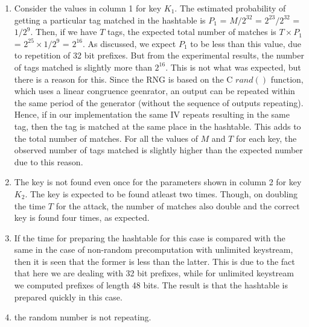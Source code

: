 \begin{enumerate}
\item Consider the values in column 1 for key $K_1$. The estimated probability of getting a particular tag matched in the hashtable is $P_1$ = $M/2^{32}$ = $2^{23}/2^{32}$ = $1/2^{9}$. Then, if we have $T$ tags, the expected total number of matches is $T \times P_1$ = $2^{25} \times 1/2^{9}$ = $2^{16}$. As discussed, we expect $P_1$ to be less than this value, due to repetition of 32 bit prefixes. But from the experimental results, the number of tags matched is slightly more than $2^{16}$. This is not what was expected, but there is a reason for this.
Since the RNG is based on the C $rand()$ function, which uses a linear congruence geenrator, an output can be repeated within the same period of the generator (without the sequence of outputs repeating). Hence, if in our implementation the same IV repeats resulting in the same tag, then the tag is matched at the same place in the hashtable. This adds to the total number of matches. For all the values of $M$ and $T$ for each key, the observed number of tags matched is slightly higher than the expected number due to this reason.

\item The key is not found even once for the parameters shown in column 2 for key $K_2$. The key is expected to be found atleast two times. Though, on doubling the time $T$ for the attack, the number of matches also double and the correct key is found four times, as expected. 

\item If the time for preparing the hashtable for this case is compared with the same in the case of non-random precomputation with unlimited keystream, then it is seen that the former is less than the latter. This is due to the fact that here we are dealing with 32 bit prefixes, while for unlimited keystream we computed prefixes of length 48 bits. The result is that the hashtable is prepared quickly in this case. 

\item the random number is not repeating. 
\end{enumerate}